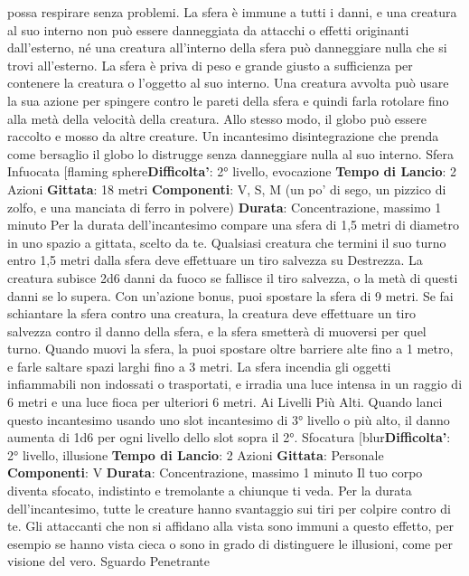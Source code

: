 \begin{multicols}{2}
possa respirare senza problemi. La sfera è immune a
tutti i danni, e una creatura al suo interno non può
essere danneggiata da attacchi o effetti originanti
dall’esterno, né una creatura all’interno della sfera può
danneggiare nulla che si trovi all’esterno.
La sfera è priva di peso e grande giusto a sufficienza
per contenere la creatura o l’oggetto al suo interno. Una
creatura avvolta può usare la sua azione per spingere
contro le pareti della sfera e quindi farla rotolare fino
alla metà della velocità della creatura. Allo stesso
modo, il globo può essere raccolto e mosso da altre
creature.
Un incantesimo disintegrazione che prenda come
bersaglio il globo lo distrugge senza danneggiare nulla
al suo interno.
Sfera Infuocata
[flaming sphere\textbf{Difficolta'}:
2° livello, evocazione
\textbf{Tempo di Lancio}: 2 Azioni
\textbf{Gittata}: 18 metri
\textbf{Componenti}: V, S, M (un po’ di sego, un pizzico di
zolfo, e una manciata di ferro in polvere)
\textbf{Durata}: Concentrazione, massimo 1 minuto
Per la durata dell’incantesimo compare una sfera di 1,5
metri di diametro in uno spazio a gittata, scelto da te.
Qualsiasi creatura che termini il suo turno entro 1,5
metri dalla sfera deve effettuare un tiro salvezza su
Destrezza. La creatura subisce 2d6 danni da fuoco se
fallisce il tiro salvezza, o la metà di questi danni se lo
supera.
Con un’azione bonus, puoi spostare la sfera di 9 metri.
Se fai schiantare la sfera contro una creatura, la
creatura deve effettuare un tiro salvezza contro il danno
della sfera, e la sfera smetterà di muoversi per quel
turno.
Quando muovi la sfera, la puoi spostare oltre barriere
alte fino a 1 metro, e farle saltare spazi larghi fino a 3
metri. La sfera incendia gli oggetti infiammabili non
indossati o trasportati, e irradia una luce intensa in un
raggio di 6 metri e una luce fioca per ulteriori 6 metri.
Ai Livelli Più Alti. Quando lanci questo incantesimo
usando uno slot incantesimo di 3° livello o più alto, il
danno aumenta di 1d6 per ogni livello dello slot sopra il
2°.
Sfocatura
[blur\textbf{Difficolta'}:
2° livello, illusione
\textbf{Tempo di Lancio}: 2 Azioni
\textbf{Gittata}: Personale
\textbf{Componenti}: V
\textbf{Durata}: Concentrazione, massimo 1 minuto
Il tuo corpo diventa sfocato, indistinto e tremolante a
chiunque ti veda. Per la durata dell’incantesimo, tutte le
creature hanno svantaggio sui tiri per colpire contro di
te. Gli attaccanti che non si affidano alla vista sono
immuni a questo effetto, per esempio se hanno vista
cieca o sono in grado di distinguere le illusioni, come
per visione del vero.
Sguardo Penetrante

\end{multicols}
